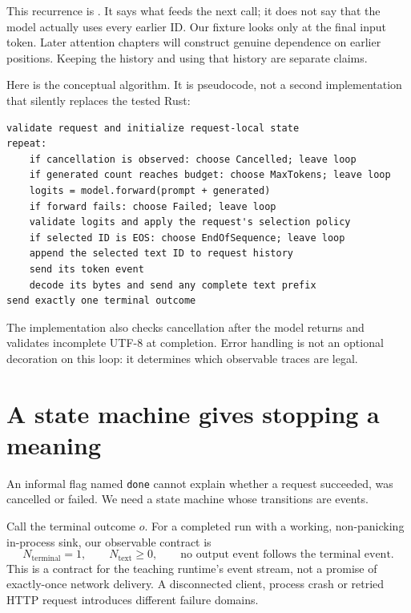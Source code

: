 This recurrence is . It says what feeds the next call;
it does not say that the model actually uses every earlier ID. Our fixture
looks only at the final input token. Later attention chapters will construct
genuine dependence on earlier positions. Keeping the history and using that
history are separate claims.

Here is the conceptual algorithm. It is pseudocode, not a second implementation
that silently replaces the tested Rust:
\begin{verbatim}
validate request and initialize request-local state
repeat:
    if cancellation is observed: choose Cancelled; leave loop
    if generated count reaches budget: choose MaxTokens; leave loop
    logits = model.forward(prompt + generated)
    if forward fails: choose Failed; leave loop
    validate logits and apply the request's selection policy
    if selected ID is EOS: choose EndOfSequence; leave loop
    append the selected text ID to request history
    send its token event
    decode its bytes and send any complete text prefix
send exactly one terminal outcome
\end{verbatim}
The implementation also checks cancellation after the model returns and
validates incomplete UTF-8 at completion. Error handling is not an optional
decoration on this loop: it determines which observable traces are legal.

\section{A state machine gives stopping a meaning}
An informal flag named \texttt{done} cannot explain whether a request succeeded,
was cancelled or failed. We need a state machine whose transitions are events.


Call the terminal outcome $o$. For a completed run with a working, non-panicking
in-process sink, our observable contract is
\begin{equation}
N_{\mathrm{terminal}}=1,\qquad
N_{\mathrm{text}}\geq 0,\qquad
\text{no output event follows the terminal event}.
\label{eq:terminal-contract}
\end{equation}
This is a contract for the teaching runtime's event stream, not a promise of
exactly-once network delivery. A disconnected client, process crash or retried
HTTP request introduces different failure domains.

